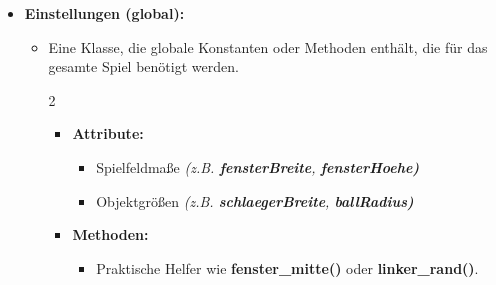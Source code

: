 \documentclass[a4paper,12pt]{article}
\begin{document}
\begin{itemize}[label={},leftmargin=*,noitemsep,topsep=0pt,parsep=0pt]
\begin{itemize}[label={},leftmargin=*,noitemsep,topsep=0pt,parsep=0pt]
    \end{itemize}
    \vspace{-0.4\baselineskip}
    \item \textbf{Einstellungen (global):}
        \begin{itemize}[label={},leftmargin=*,noitemsep,topsep=0pt,parsep=0pt]
            \item Eine Klasse, die globale Konstanten oder Methoden enthält, die für das gesamte Spiel benötigt werden.
            \vspace{-0.9\baselineskip}
            \begin{multicols}{2}
            \begin{itemize}[label={},leftmargin=*,noitemsep,topsep=0pt,parsep=0pt]
                \item \textbf{Attribute:}
                \begin{itemize}[label={},leftmargin=*,noitemsep,topsep=0pt,parsep=0pt]
                    \item Spielfeldmaße \textit{(z.B. \textbf{fensterBreite}, \textbf{fensterHoehe)}}
                    \item Objektgrößen \textit{(z.B. \textbf{schlaegerBreite}, \textbf{ballRadius)}}
                \end{itemize}
            \end{itemize}
            \columnbreak
            \begin{itemize}[label={},leftmargin=*,noitemsep,topsep=0pt,parsep=0pt]
                \item \textbf{Methoden:}
                \begin{itemize}[label={},leftmargin=*,noitemsep,topsep=0pt,parsep=0pt]
                    \item Praktische Helfer wie \textbf{fenster\_mitte()} oder \textbf{linker\_rand()}.
                \end{itemize}
            \end{itemize}
            \end{multicols}
        \end{itemize}
\end{itemize}
\vspace{-0.5\baselineskip}
\end{document}
